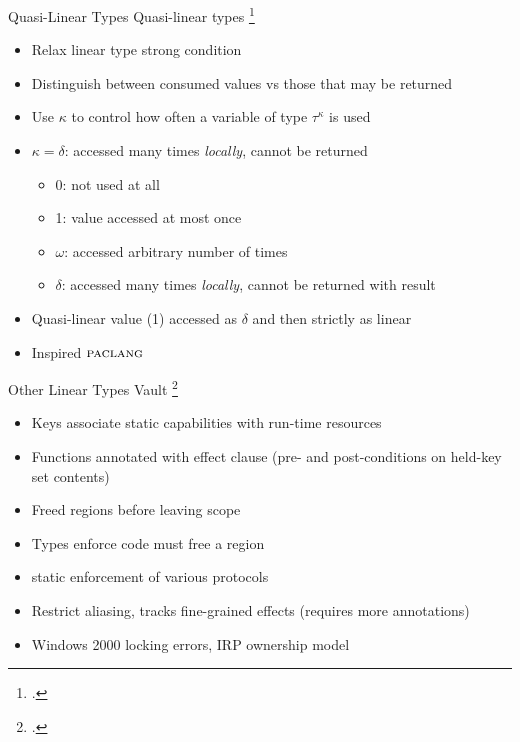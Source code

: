 \documentclass[aspectratio=169]{beamer}
\begin{document}
\begin{frame}{Quasi-Linear Types}
\footnotesize
  Quasi-linear types \footcite{kobayashi_quasi-linear_1999} %
    \begin{itemize}
        \item Relax linear type strong condition
        \item Distinguish between consumed values vs those that may be returned
        \item Use $\kappa$ to control how often a variable of type $\tau^{\kappa}$ is used
        \item $\kappa = \delta$: accessed many times \emph{locally}, cannot be returned
            \begin{itemize}
                \item 0: not used at all
                \item 1: value accessed at most once
                \item $\omega$: accessed arbitrary number of times
                \item $\delta$: accessed many times \emph{locally}, cannot be returned with result
            \end{itemize}
        \item Quasi-linear value (1) accessed as $\delta$ and then strictly as linear
        \item Inspired $\textsc{paclang}$
    \end{itemize}
\end{frame}

\begin{frame}{Other Linear Types}
\footnotesize
  Vault \footcite{deline_enforcing_2001}
    \vspace{-0.09in}
    \begin{itemize}
        \item Keys associate static capabilities with run-time resources %
        \item Functions annotated with effect clause (pre- and post-conditions on held-key set contents)
        \item Freed regions before leaving scope
        \item Types enforce code must free a region
        \item static enforcement of various protocols
        \item Restrict aliasing, tracks fine-grained effects (requires more annotations)
        \item Windows 2000 locking errors, IRP ownership model %
    \end{itemize}
\end{frame}
\end{document}
